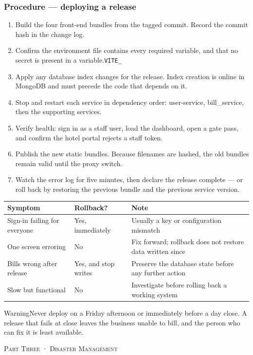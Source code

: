 \documentclass[11pt,a4paper,oneside]{book}
\begin{document}
\subsubsection*{Procedure — deploying a release}
\begin{enumerate}
\item Build the four front-end bundles from the tagged commit. Record the commit hash in the change log.
\item Confirm the environment file contains every required variable, and that no secret is present in a  variable.\texttt{VITE\_}
\item Apply any database index changes for the release. Index creation is online in MongoDB and must precede the code that depends on it.
\item Stop and restart each service in dependency order: user-service, bill\_service, then the supporting services.
\item Verify health: sign in as a staff user, load the dashboard, open a gate pass, and confirm the hotel portal rejects a staff token.
\item Publish the new static bundles. Because filenames are hashed, the old bundles remain valid until the proxy switch.
\item Watch the error log for five minutes, then declare the release complete — or roll back by restoring the previous bundle and the previous service version.
\end{enumerate}
\begin{center}\small
\begin{tabularx}{\linewidth}{|X|X|X|}
\hline
\rowcolor{lightgrey}
\textbf{Symptom} & \textbf{Rollback?} & \textbf{Note} \\ \hline
Sign-in failing for everyone & Yes, immediately & Usually a key or configuration mismatch \\ \hline
One screen erroring & No & Fix forward; rollback does not restore data written since \\ \hline
Bills wrong after release & Yes, and stop writes & Preserve the database state before any further action \\ \hline
Slow but functional & No & Investigate before rolling back a working system \\ \hline
\end{tabularx}
\end{center}
\begin{notebox}WarningNever deploy on a Friday afternoon or immediately before a day close. A release that fails at close leaves the business unable to bill, and the person who can fix it is least available.\end{notebox}
\textsc{\small\color{crimson}Part Three · Disaster Management}\par\medskip
\end{document}
